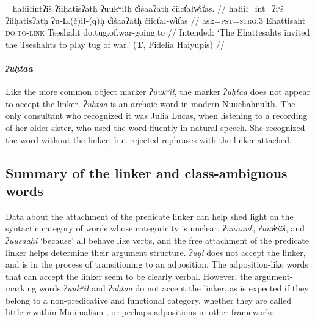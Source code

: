 \ex~ \label{ex:tugofwar2}
\begingl
\glpreamble *hałiiłintʔiš ʔiiḥatisʔatḥ ʔuukʷiłḥ c̓išaaʔatḥ čiict̓ałw̓it̓as. //
\gla hałiił=int=ʔiˑš ʔiiḥatisʔatḥ ʔu-L.(č)ił-(q)ḥ c̓išaaʔatḥ čiict̓ał-w̓it̓as //
\glb ask=\textsc{pst}=\textsc{strg.3} Ehattisaht \textsc{do.to}-\textsc{link} Tseshaht do.tug.of.war-going.to //
\glft Intended: `The Ehattesahts invited the Tseshahts to play tug of war.' (\textbf{T}, Fidelia Haiyupis) //
\endgl
\xe

\paragraph{\textit{ʔuḥtaa}} \label{ch:link:uhta} Like the more common object marker \textit{ʔuukʷił}, the marker \textit{ʔuḥtaa} does not appear to accept the linker. \textit{ʔuḥtaa} is an archaic word in modern Nuuchahnulth. The only consultant who recognized it was Julia Lucas, when listening to a recording of her older sister, who used the word fluently in natural speech. She recognized the word without the linker, but rejected rephrases with the linker attached.

\begin{comment}
\vspace{5pt}

\noindent Context for (\ref{ex:uhta}, \ref{ex:uhtaqh}), discussing family relations.

\ex \label{ex:uhta}
\begingl
\glpreamble ʔuḥtaa Jane ʔuʔukʷił Alexandra y̓ukʷiiqsu. //
\gla ʔuḥtaa Jane ʔuʔukʷił Alexandra y̓ukʷiiqsu //
\glb only.\textsc{do.to} Jane call Alexandra younger.sibling //
\glft `Only Jane can call Alexandra younger.' (\textbf{C}, \textit{tupaat} Julia Lucas) //
\endgl
\xe

\ex~ \label{ex:uhtaqh}
\begingl
\glpreamble *ʔuḥtaaqḥ Jane ʔuʔukʷił Alexandra y̓ukʷiiqsu. //
\gla ʔuḥtaa-(q)ḥ Jane ʔuʔukʷił Alexandra y̓ukʷiiqsu //
\glb only.\textsc{do.to}-\textsc{link} Jane call Alexandra younger.sibling //
\glft Intended: `Only Jane can call Alexandra younger.' (\textbf{C}, \textit{tupaat} Julia Lucas) //
\endgl
\xe
\end{comment}

\subsection{Summary of the linker and class-ambiguous words}

Data about the attachment of the predicate linker can help shed light on the syntactic category of words whose categoricity is unclear. \textit{ʔuunuuƛ}, \textit{ʔunw̓iiƛ}, and \textit{ʔuusaaḥi} `because' all behave like verbs, and the free attachment of the predicate linker helps determine their argument structure. \textit{ʔuyi} does not accept the linker, and is in the process of transitioning to an adposition. The adposition-like words that can accept the linker seem to be clearly verbal. However, the argument-marking words \textit{ʔuukʷił} and \textit{ʔuḥtaa} do not accept the linker, as is expected if they belong to a non-predicative and functional category, whether they are called little-\textit{v} within Minimalism \citep{woo2007b}, or perhaps adpositions in other frameworks.

